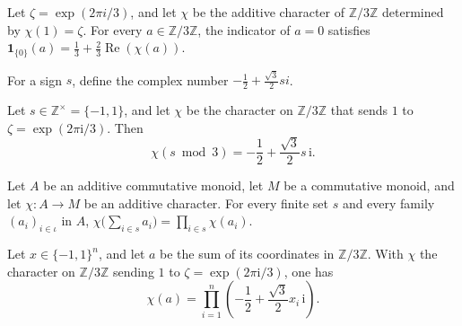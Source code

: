 \begin{theorem}
\label{FABL.modThreeCubicFilter}
\leanok
{}
Let $\zeta=\exp(2\pi i/3)$, and let $\chi$ be the additive character of $\mathbb
Z/3\mathbb Z$ determined by $\chi(1)=\zeta$. For every $a\in\mathbb Z/3\mathbb Z$, the
indicator of $a=0$ satisfies $\mathbf
1_{\{0\}}(a)=\frac13+\frac23\operatorname{Re}(\chi(a))$.
\end{theorem}

\begin{definition}
\label{FABL.modThreeCubicFactor}
\leanok
{}
For a sign $s$, define the complex number $-\frac12 + \frac{\sqrt{3}}2 s i$.
\end{definition}

\begin{theorem}
\label{FABL.modThreeCubicCharacter_intCast_sign}
\leanok
{}
Let $s\in\mathbb Z^\times=\{-1,1\}$, and let $\chi$ be the character on $\mathbb
Z/3\mathbb Z$ that sends $1$ to $\zeta=\exp(2\pi\mathrm{i}/3)$. Then $$\chi(s\bmod
3)=-\frac12+\frac{\sqrt3}{2}s\,\mathrm{i}.$$
\end{theorem}

\begin{theorem}
\label{FABL.addChar_map_finset_sum_eq_prod}
\leanok
{}
Let $A$ be an additive commutative monoid, let $M$ be a commutative monoid, and let
$\chi:A\to M$ be an additive character. For every finite set $s$ and every family
$(a_i)_{i\in\iota}$ in $A$, $\chi\bigl(\sum_{i\in s}a_i\bigr)=\prod_{i\in s}\chi(a_i)$.
\end{theorem}

\begin{theorem}
\label{FABL.modThreeCubicCharacter_residue}
\leanok
{}
Let $x\in\{-1,1\}^n$, and let $a$ be the sum of its coordinates in $\mathbb Z/3\mathbb
Z$. With $\chi$ the character on $\mathbb Z/3\mathbb Z$ sending $1$ to
$\zeta=\exp(2\pi\mathrm{i}/3)$, one has
$$\chi(a)=\prod_{i=1}^n\left(-\frac12+\frac{\sqrt3}{2}x_i\,\mathrm{i}\right).$$
\end{theorem}

